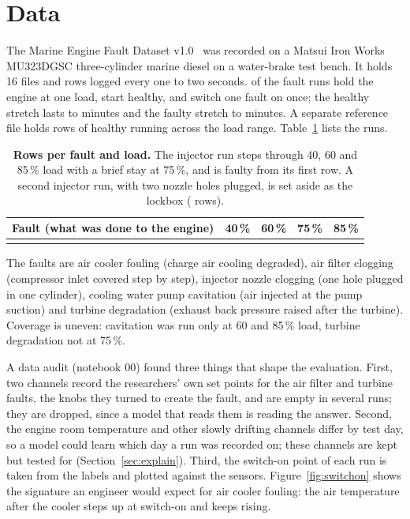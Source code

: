 \documentclass[10pt]{article}
\begin{document}
\section{Data}

The Marine Engine Fault Dataset v1.0~\cite{bahootoroody2026dataset} was recorded on a Matsui Iron Works MU323DGSC three-cylinder marine diesel on a water-brake test bench. It holds 16 files and \DataRowsAll{} rows logged every one to two seconds. \DataRunsWithSwitchOn{} of the \DataFaultRuns{} fault runs hold the engine at one load, start healthy, and switch one fault on once; the healthy stretch lasts \DataHealthyMinMin{} to \DataHealthyMinMax{} minutes and the faulty stretch \DataFaultyMinMin{} to \DataFaultyMinMax{} minutes. A separate reference file holds \DataRowsReference{} rows of healthy running across the load range. Table~\ref{tab:coverage} lists the runs.

\begin{table}[!htbp]
\caption{\textbf{Rows per fault and load.} The injector run steps through 40, 60 and 85\,\% load with a brief stay at 75\,\%, and is faulty from its first row. A second injector run, with two nozzle holes plugged, is set aside as the lockbox (\DataRowsLockbox{} rows).}
\label{tab:coverage}
\centering\small
\begin{tabular}{@{}lrrrr@{}}
\toprule
Fault (what was done to the engine) & 40\,\% & 60\,\% & 75\,\% & 85\,\% \\
\midrule
{}{data/coverage.tex}
\bottomrule
\end{tabular}
\end{table}

The faults are air cooler fouling (charge air cooling degraded), air filter clogging (compressor inlet covered step by step), injector nozzle clogging (one hole plugged in one cylinder), cooling water pump cavitation (air injected at the pump suction) and turbine degradation (exhaust back pressure raised after the turbine). Coverage is uneven: cavitation was run only at 60 and 85\,\% load, turbine degradation not at 75\,\%.

A data audit (notebook 00) found three things that shape the evaluation. First, two channels record the researchers' own set points for the air filter and turbine faults, the knobs they turned to create the fault, and are empty in several runs; they are dropped, since a model that reads them is reading the answer. Second, the engine room temperature and other slowly drifting channels differ by test day, so a model could learn which day a run was recorded on; these channels are kept but tested for (Section~\ref{sec:explain}). Third, the switch-on point of each run is taken from the labels and plotted against the sensors. Figure~\ref{fig:switchon} shows the signature an engineer would expect for air cooler fouling: the air temperature after the cooler steps up at switch-on and keeps rising.
\end{document}

